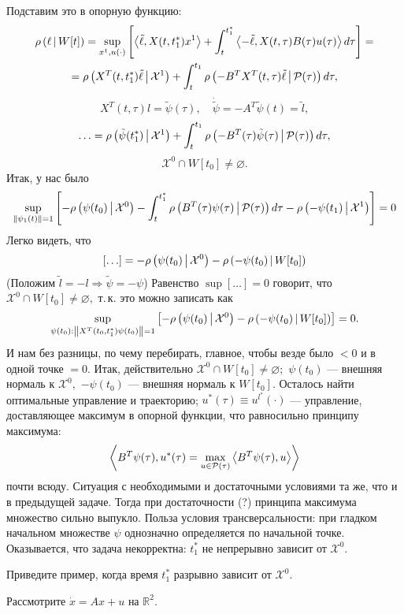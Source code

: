 Подставим это в опорную функцию:
\begin{gather*}
  \rho\left(\ell\,\middle|\,W[t]\right) = \sup_{x^1, u(\cdot)}
    \left[\left<\tilde{\ell},X(t, t_1^*)x^1\right> +
    \int_t^{t_1^*}\left<-\tilde{\ell},X(t, \tau)B(\tau)u(\tau)\right>d\tau\right] =\\
    =\rho\left(X^T(t,t_1^*)\tilde{\ell}\,\middle|\,\mathcal{X}^1\right) +
    \int_t^{t_1}\rho\left(-B^TX^T(t, \tau)\tilde{\ell}\,\middle|\,\mathcal{P}(\tau)\right)d\tau,
\end{gather*}
$$
X^T(t,\tau)l=\tilde{\psi}(\tau),\quad \dot{\tilde{\psi}}=-A^T\tilde{\psi}(t)=\tilde{l},
$$
$$
\ldots=\rho\left(\tilde{\psi}(t_1^*)\,\middle|\,\mathcal{X}^1\right)+\int_{t}^{t_1}\rho\left(-B^T(\tau)\tilde{\psi}(\tau)\,\middle|\,\mathcal{P}(\tau)\right)d\tau,
$$
$$
\mathcal{X}^0\cap W[t_0]\ne \varnothing.
$$
Итак, у нас было
$$
\sup_{\left\| \psi_1(t) \right\|=1}\left[-\rho\left(\psi(t_0)\,\middle|\,\mathcal{X}^0\right)-\int_t^{t_1^*}
\rho\left(B^T(\tau)\psi(\tau)\,\middle|\,\mathcal{P}(\tau)\right)d\tau -\rho\left(-\psi(t_1)\,\middle|\,\mathcal{X}^1\right)\right]=0
$$
Легко видеть, что $$[\ldots] = -\rho\left(\psi(t_0)\,\middle|\,\mathcal{X}^0\right)-\rho\left(-\psi(t_0)\,\middle|\,W[t_0]\right)
$$
(Положим $\tilde{l}=-l \Rightarrow \tilde\psi = -\psi$)
Равенство $\sup [\ldots] = 0$ говорит, что $\mathcal{X}^0\cap W[t_0]\ne \varnothing,$ т.\,к. это можно записать как 
$$
\sup_{\psi(t_0):\left\| X^T(t_0,t_1^*)\psi(t_0) \right\|=1}\left[-\rho\left(\psi(t_0)\,\middle|\,\mathcal{X}^0\right)-
\rho\left(-\psi(t_0)\,\middle|\,W[t_0]\right)\right]=0.
$$
 И нам без разницы, по чему перебирать, главное, чтобы везде было $<0$ и в одной точке $=0.$ Итак, действительно 
$\mathcal{X}^0\cap W[t_0]\ne \varnothing;$ $\psi(t_0)$ --- внешняя нормаль к $\mathcal{X}^0,$ $-\psi(t_0)$ --- внешняя 
нормаль к $W[t_0].$ Осталось найти оптимальные управление и траекторию; $u^*(\tau)\equiv u^{l^*}(\cdot)$ --- управление, 
доставляющее максимум в опорной функции, что равносильно принципу максимума:
$$
\left<B^T\psi(\tau),u^*(\tau)=\max_{u\in\mathcal {P}(\tau)}\left<B^T\psi(\tau),u\right>\right>
$$   
почти всюду. Ситуация с необходимыми и достаточными условиями та же, что и в предыдущей задаче. Тогда при достаточности (?) 
принципа максимума множество сильно выпукло. Польза условия трансверсальности: при гладком начальном множестве $\psi$ 
однозначно определяется по начальной точке.
Оказывается, что задача некорректна: $t_1^*$ не непрерывно зависит от $\mathcal{X}^0.$
\begin{problem}
Приведите пример, когда время $t_1^*$ разрывно зависит от $\mathcal{X}^0.$
\end{problem}
\begin{tproblem} 
Рассмотрите $\dot{x}=Ax+u$ на $\mathbb{R}^2$.
\end{tproblem}